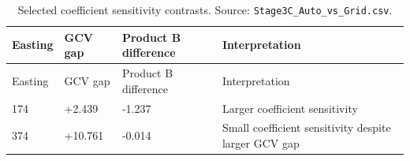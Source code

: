 \begin{longtable}{@{}p{1.7cm}p{2.2cm}p{3.2cm}p{7.1cm}@{}}
\caption{Selected coefficient sensitivity contrasts. Source: \texttt{Stage3C\_Auto\_vs\_Grid.csv}.}\label{tab:selected-coefficient-sensitivity-contrasts}\\
\toprule
Easting & GCV gap & Product B difference & Interpretation\\
\midrule
\endfirsthead
\toprule
Easting & GCV gap & Product B difference & Interpretation\\
\midrule
\endhead
174 & +2.439 & -1.237 & Larger coefficient sensitivity\\
374 & +10.761 & -0.014 & Small coefficient sensitivity despite larger GCV gap\\
\bottomrule
\end{longtable}
